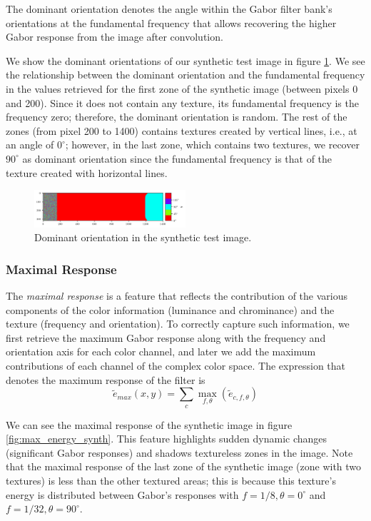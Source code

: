 \documentclass[journal]{IEEEtran}
\begin{document}
The dominant orientation denotes the angle within the Gabor filter bank's orientations at the fundamental frequency that allows recovering the higher Gabor response from the image after convolution.

We show the dominant orientations of our synthetic test image in figure \ref{fig:dom_orient_synth}. We see the relationship between the dominant orientation and the fundamental frequency in the values retrieved for the first zone of the synthetic image (between pixels 0 and 200). Since it does not contain any texture, its fundamental frequency is the frequency zero; therefore, the dominant orientation is random. The rest of the zones (from pixel 200 to 1400) contains textures created by vertical lines, i.e., at an angle of $0^\circ$; however, in the last zone, which contains two textures, we recover $90^\circ$ as dominant orientation since the fundamental frequency is that of the texture created with horizontal lines. 

\begin{figure}[!ht]
	\includegraphics[width=0.5\textwidth]{dom_orient_synth}
    \caption{Dominant orientation in the synthetic test image.}
    \label{fig:dom_orient_synth}
\end{figure}

\subsubsection{Maximal Response}
The \textit{maximal response} is a feature that reflects the contribution of the various components of the color information (luminance and chrominance) and the texture (frequency and orientation). To correctly capture such information, we first retrieve the maximum Gabor response along with the frequency and orientation axis for each color channel, and later we add the maximum contributions of each channel of the complex color space. The expression that denotes the maximum response of the filter is
\begin{equation}
	\widetilde{e}_{max}(x,y) = \underset{c}{\sum} \underset{f, \theta}{\max} (\widetilde{e}_{c, f, \theta}) \label{eq:max_energy}
\end{equation}

We can see the maximal response of the synthetic image in figure \ref{fig:max_energy_synth}. This feature highlights sudden dynamic changes (significant Gabor responses) and shadows textureless zones in the image. Note that the maximal response of the last zone of the synthetic image (zone with two textures) is less than the other textured areas; this is because this texture's energy is distributed between Gabor's responses with $f=1/8, \theta=0^\circ$ and $f=1/32, \theta=90^\circ$.
\end{document}
